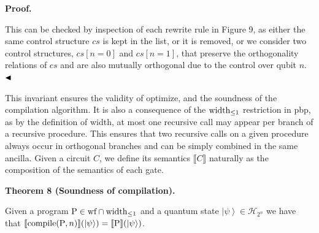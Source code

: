 \documentclass[10pt,a4paper]{amsart}
\begin{document}
 
 
 
\par\medskip\noindent\textbf{Proof.}\par
 
 
This can be checked by inspection of each rewrite rule in Figure 9, as either the same control structure $cs$ is kept in the list, or it is removed, or we consider two control structures, $cs[n=0]$ and $cs[n=1]$, that preserve the orthogonality relations of $cs$ and are also mutually orthogonal due to the control over qubit $n$. $\hfill\blacktriangleleft$\par
 
 
 
This invariant ensures the validity of optimize, and the soundness of the compilation algorithm. It is also a consequence of the $\textnormal{{width}}_{\leq 1}$ restriction in pbp, as by the definition of width, at most one recursive call may appear per branch of a recursive procedure. This ensures that two recursive calls on a given procedure always occur in orthogonal branches and can be simply combined in the same ancilla. Given a circuit $C$, we define its semantics $\llbracket C\rrbracket$ naturally as the composition of the semantics of each gate.\par
 
 
 
\par\medskip\noindent\textbf{Theorem 8 (Soundness of compilation).}\par
 
 
Given a program $\mathrm{P}\in\textnormal{{wf}}\cap\textnormal{{width}}_{\leq 1}$ and a quantum state $\left|\psi\right\rangle\in\mathcal{H}_{2^{n}}$ we have that $\llbracket\textnormal{{compile}}{}(\mathrm{P},n)\rrbracket(\left|\psi\right%
\rangle)=\llbracket\mathrm{P}\rrbracket(\left|\psi\right\rangle)$.\par
 
 
 
 
\end{document}
